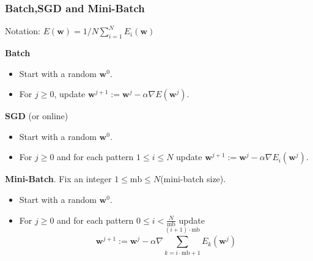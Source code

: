 \documentclass{beamer}
\begin{document}
	\begin{frame}
		\frametitle{Batch,SGD and Mini-Batch}
		Notation: $E(\bm{w}) = 1/N \sum_{i=1}^N E_i(\bm{w})$
		
		\vspace{5mm}
		
		\textbf{Batch}
		\begin{itemize}
			\item Start with a random $\bm{w}^0$.
			\item For $j \geq 0$, update $\bm{w}^{j+1} := \bm{w}^{j} - \alpha \nabla E(\bm{w}^j)$.
		\end{itemize}
		
		\textbf{SGD} (or online)
		\begin{itemize}
			\item Start with a random $\bm{w}^0$.
			\item For $j \geq 0$ and for each pattern $1\leq i \leq N$ update $\bm{w}^{j+1} := \bm{w}^{j} - \alpha \nabla E_i(\bm{w}^j)$.
		\end{itemize}
	
		\textbf{Mini-Batch}. Fix an integer $1 \leq \text{mb} \leq N$(mini-batch size).
		\begin{itemize}
			\item Start with a random $\bm{w}^0$.
			\item For $j \geq 0$ and for each pattern $0 \leq i < \frac{N}{\text{mb}}$ update
			\begin{equation*}
				\bm{w}^{j+1} := \bm{w}^{j} - \alpha \nabla \sum_{k=i\cdot\text{mb} + 1}^{(i+1)\cdot\text{mb}}E_k(\bm{w}^j)
			\end{equation*}
		\end{itemize}
		
	\end{frame}
\end{document}
